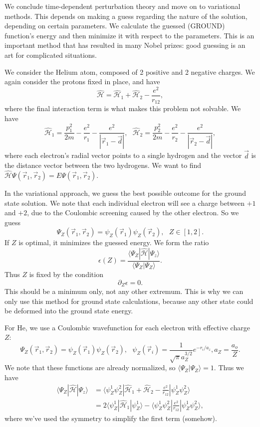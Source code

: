 \documentclass[fontsize=12pt]{scrartcl}
\newcommand{\ptl}{\partial}
\newcommand{\la}{\langle}
\newcommand{\ra}{\rangle}
\newcommand{\Ham}{\hat{\mathcal{H}}}
\begin{document}
We conclude time-dependent perturbation theory and move on to variational methods. This depends on making a guess regarding the nature of the solution, depending on certain parameters. We calculate the guessed (GROUND) function's energy and then minimize it with respect to the parameters. This is an important method that has resulted in many Nobel prizes: good guessing is an art for complicated situations.

We consider the Helium atom, composed of 2 positive and 2 negative charges. We again consider the protons fixed in place, and have $$\Ham=\Ham_1+\Ham_2-\frac{e^2}{r_{12}},$$ where the final interaction term is what makes this problem not solvable. We have $$\Ham_1 = \frac{p_1^2}{2m}-\frac{e^2}{r_1}-\frac{e^2}{|\vec{r}_1-\vec{d}|}, \ \ \ \Ham_2= \frac{p_2^2}{2m}-\frac{e^2}{r_2}-\frac{e^2}{|\vec{r}_2-\vec{d}|},$$ where each electron's radial vector points to a single hydrogen and the vector $\vec{d}$ is the distance vector between the two hydrogens. We want to find $\Ham\Psi(\vec{r}_1,\vec{r}_2)=E\Psi(\vec{r}_1,\vec{r}_2).$

In the variational approach, we guess the best possible outcome for the ground state solution. We note that each individual electron will see a charge between $+1$ and $+2$, due to the Coulombic screening caused by the other electron. So we guess $$\Psi_Z(\vec{r}_1,\vec{r}_2) = \psi_Z(\vec{r}_1)\psi_Z(\vec{r}_2), \ \ \ Z\in[1,2].$$ If $Z$ is optimal, it minimizes the guessed energy. We form the ratio $$\epsilon(Z)=\frac{\la \Psi_Z|\Ham|\Psi_z\ra}{\la\Psi_Z|\Psi_Z\ra}.$$ Thus $Z$ is fixed by the condition $$\ptl_Z\epsilon = 0.$$ This should be a minimum only, not any other extremum. This is why we can only use this method for ground state calculations, because any other state could be deformed into the ground state energy.

For He, we use a Coulombic wavefunction for each electron with effective charge $Z$: $$\Psi_Z(\vec{r}_1,\vec{r}_2)=\psi_Z(\vec{r}_1)\psi_Z(\vec{r}_2), \ \ \ \psi_Z(\vec{r}_i)=\frac{1}{\sqrt{\pi}a_Z^{3/2}}e^{-r_i/a_z}, a_Z=\frac{a_o}{Z}.$$ We note that these functions are already normalized, so $\la\Psi_Z|\Psi_Z\ra=1$. Thus we have \begin{align*}
\la \Psi_Z|\Ham|\Psi_z\ra &= \la \psi^1_Z\psi^2_Z|\Ham_1+\Ham_2-\frac{e^2}{r_{12}}|\psi_Z^1\psi_Z^2\ra\\
&= 2 \la \psi_Z^1|\Ham_1|\psi_Z^1\ra - \la\psi^1_Z\psi^2_Z|\frac{e^2}{r_{12}}|\psi_Z^1\psi_Z^2\ra,
\end{align*} where we've used the symmetry to simplify the first term (somehow).
\end{document}
